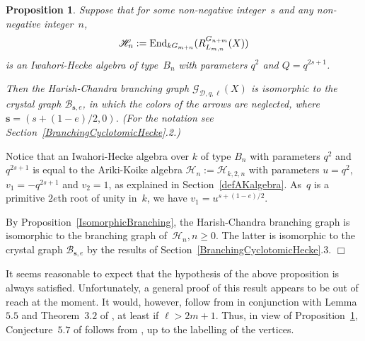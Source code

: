 \documentclass[twoside,12pt]{amsart}
\theoremstyle{plain}
\newenvironment{prf}{{\bf Proof.}}{\hfill $\Box$ \\[-1.0ex]}
\newtheorem{prp}[num]{Proposition}
\begin{document}
\begin{prp}
\label{HCGraphIsCrystalGraph}
Suppose that for some non-negative integer~$s$ and any non-negative integer~$n$,
$$\mathscr{H}_n := {\mbox{\rm End}}_{kG_{m+n}}( R_{L_{m,n}}^{G_{n+m}}( X ) )$$ is an 
Iwahori-Hecke algebra of type~$B_n$ with parameters $q^2$ and $Q = q^{2s+1}$. 

Then the Harish-Chandra branching graph $\mathcal{G}_{\mathcal{D},q,\ell}(X)$
is isomorphic to the crystal graph $\mathcal{B}_{\mathbf{s},e}$, in which the
colors of the arrows are neglected, where 
$\mathbf{s} = (s + (1-e)/2,0)$. (For the notation see 
Section~\ref{BranchingCyclotomicHecke}.2.)
\end{prp}
\begin{prf}
Notice that an Iwahori-Hecke algebra over $k$ of type $B_n$ with parameters
$q^2$ and $q^{2s+1}$ is equal to the Ariki-Koike algebra ${\mathcal{H}}_n := 
\mathcal{H}_{k,2,n}$
with parameters $u = q^2$, $v_1 = -q^{2s+1}$ and $v_2 = 1$, as explained                  
in Section~\ref{defAKalgebra}. As~$q$ is a primitive $2e$th root of unity 
in~$k$, we have $v_1 = u^{s + (1-e)/2}$.

By Proposition~\ref{IsomorphicBranching}, the Harish-Chandra branching graph 
is isomorphic to the branching graph of~$\mathcal{H}_n, n\geq0$. 
The latter is isomorphic to the crystal graph $\mathcal{B}_{\mathbf{s},e}$ by 
the results of Section~\ref{BranchingCyclotomicHecke}.3.
\end{prf}

It seems reasonable to expect that the hypothesis of the above proposition is 
always satisfied. Unfortunately, a general proof of this result appears to be 
out of reach at the moment. It would, however, follow from 
\cite[Conjecture~$5.5$]{GerberHissJacon2014} in conjunction with Lemma~$5.5$ 
and Theorem~$3.2$ of \cite{GerberHissJacon2014}, at least if $\ell > 2m + 1$.
Thus, in view of Proposition~\ref{HCGraphIsCrystalGraph}, Conjecture~$5.7$ of 
\cite{GerberHissJacon2014} follows from 
\cite[Conjecture~$5.5$]{GerberHissJacon2014}, up to the labelling of the 
vertices.
\end{document}
